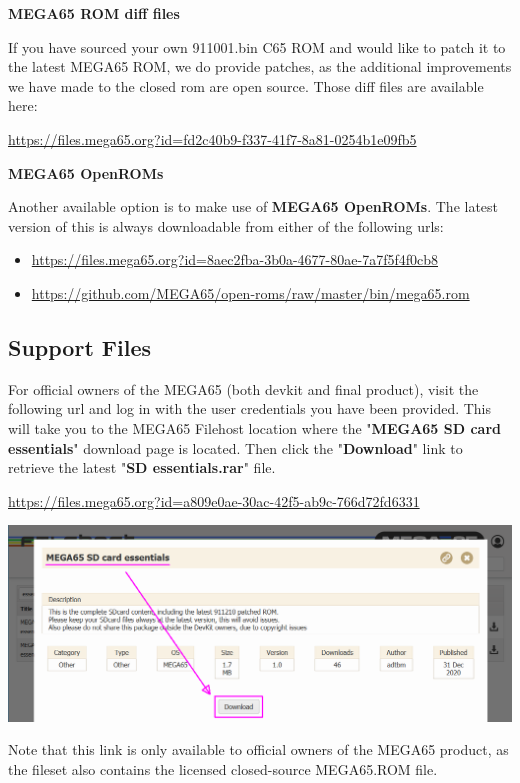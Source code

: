 \textbf{MEGA65 ROM diff files}

If you have sourced your own 911001.bin C65 ROM and would like to patch it to the latest MEGA65 ROM, we do provide patches, as the additional improvements we have made to the closed rom are open source. Those diff files are available here:

\url{https://files.mega65.org?id=fd2c40b9-f337-41f7-8a81-0254b1e09fb5}

\textbf{MEGA65 OpenROMs}

Another available option is to make use of \textbf{MEGA65 OpenROMs}. The latest version of this is always downloadable from either of the following urls:

\begin{itemize}
  \item \url{https://files.mega65.org?id=8aec2fba-3b0a-4677-80ae-7a7f5f4f0cb8}
  \item \url{https://github.com/MEGA65/open-roms/raw/master/bin/mega65.rom}
\end{itemize}


\subsection{Support Files}

For official owners of the MEGA65 (both devkit and final product), visit the following url and log in with the user credentials you have been provided. This will take you to the MEGA65 Filehost location where the "\textbf{MEGA65 SD card essentials}" download page is located. Then click the "\textbf{Download}" link to retrieve the latest "\textbf{SD essentials.rar}" file. 

\url{https://files.mega65.org?id=a809e0ae-30ac-42f5-ab9c-766d72fd6331}

\includegraphics[width=\linewidth]{images/latest_support_files_with_closedrom.png}

Note that this link is only available to official owners of the MEGA65 product, as the fileset also contains the licensed closed-source MEGA65.ROM file.

